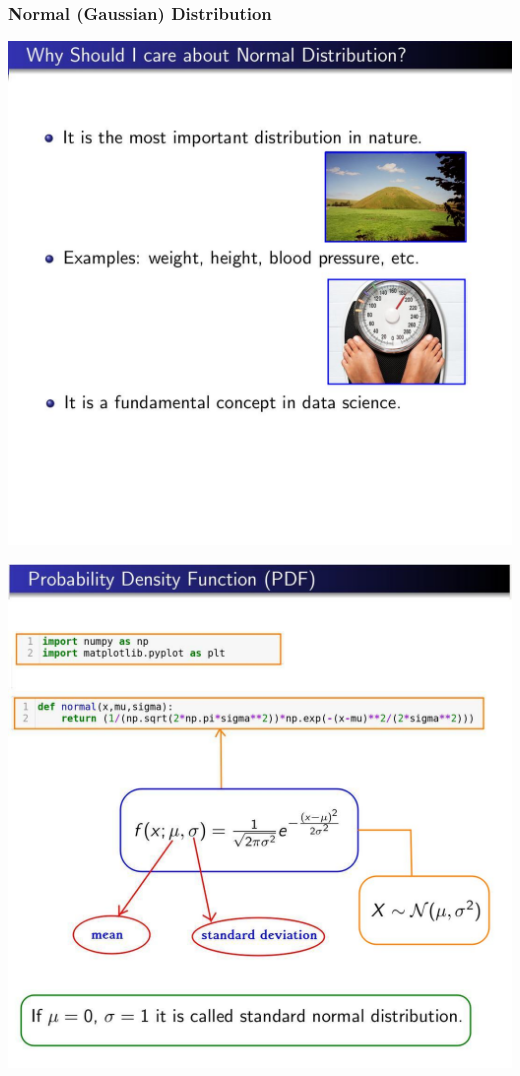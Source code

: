 \documentclass[12pt,aspectratio=169]{beamer}
\begin{document}
\begin{frame}
\frametitle{Normal (Gaussian) Distribution}
\begin{center}
\includegraphics[scale=0.3]{2}
\end{center}

\end{frame}



\begin{frame}
\begin{center}
\includegraphics[scale=0.3]{3}
\end{center}
\end{frame}
\end{document}
